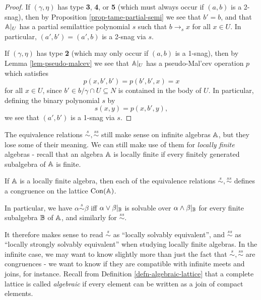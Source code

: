 \begin{appendices}
\begin{proof}
If $(\gamma, \eta)$ has type \textbf{3}, \textbf{4}, or \textbf{5} (which must always occur if $(a,b)$ is a 2-snag), then by Proposition \ref{prop-tame-partial-semi} we see that $b' = b$, and that $\mathbb{A}|_U$ has a partial semilattice polynomial $s$ such that $b \rightarrow_s x$ for all $x \in U$. In particular, $(a',b') = (a',b)$ is a 2-snag via $s$.

If $(\gamma, \eta)$ has type \textbf{2} (which may only occur if $(a,b)$ is a 1-snag), then by Lemma \ref{lem-pseudo-malcev} we see that $\mathbb{A}|_U$ has a pseudo-Mal'cev operation $p$ which satisfies
\[
p(x,b',b') = p(b',b',x) = x
\]
for all $x \in U$, since $b' \in b/\gamma \cap U \subseteq N$ is contained in the body of $U$. In particular, defining the binary polynomial $s$ by
\[
s(x,y) = p(x,b',y),
\]
we see that $(a',b')$ is a 1-snag via $s$.
\end{proof}

The equivalence relations $\stackrel{s}{\sim}, \stackrel{ss}{\sim}$ still make sense on infinite algebras $\mathbb{A}$, but they lose some of their meaning. We can still make use of them for \emph{locally finite} algebras - recall that an algebra $\mathbb{A}$ is locally finite if every finitely generated subalgebra of $\mathbb{A}$ is finite.

\begin{cor} If $\mathbb{A}$ is a locally finite algebra, then each of the equivalence relations $\stackrel{s}{\sim}, \stackrel{ss}{\sim}$ defines a congruence on the lattice $\operatorname{Con}(\mathbb{A})$.

In particular, we have $\alpha \stackrel{s}{\sim} \beta$ iff $\alpha \vee \beta|_{\mathbb{B}}$ is solvable over $\alpha \wedge \beta|_{\mathbb{B}}$ for every finite subalgebra $\mathbb{B}$ of $\mathbb{A}$, and similarly for $\stackrel{ss}{\sim}$.
\end{cor}

It therefore makes sense to read $\stackrel{s}{\sim}$ as ``locally solvably equivalent'', and $\stackrel{ss}{\sim}$ as ``locally strongly solvably equivalent'' when studying locally finite algebras. In the infinite case, we may want to know slightly more than just the fact that $\stackrel{s}{\sim}, \stackrel{ss}{\sim}$ are congruences - we want to know if they are compatible with infinite meets and joins, for instance. Recall from Definition \ref{defn-algebraic-lattice} that a complete lattice is called \emph{algebraic} if every element can be written as a join of compact elements.


\end{appendices}
